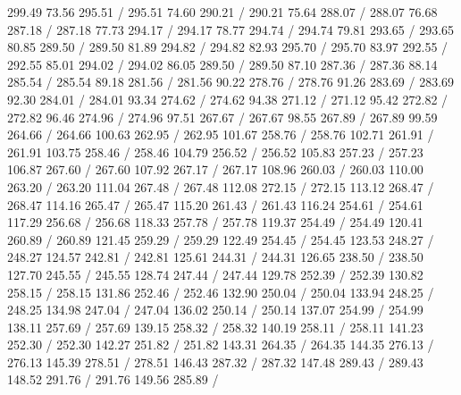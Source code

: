 { 299.49 73.56 295.51 /
 295.51 74.60 290.21 /
 290.21 75.64 288.07 /
 288.07 76.68 287.18 /
 287.18 77.73 294.17 /
 294.17 78.77 294.74 /
 294.74 79.81 293.65 /
 293.65 80.85 289.50 /
 289.50 81.89 294.82 /
 294.82 82.93 295.70 /
 295.70 83.97 292.55 /
 292.55 85.01 294.02 /
 294.02 86.05 289.50 /
 289.50 87.10 287.36 /
 287.36 88.14 285.54 /
 285.54 89.18 281.56 /
 281.56 90.22 278.76 /
 278.76 91.26 283.69 /
 283.69 92.30 284.01 /
 284.01 93.34 274.62 /
 274.62 94.38 271.12 /
 271.12 95.42 272.82 /
 272.82 96.46 274.96 /
 274.96 97.51 267.67 /
 267.67 98.55 267.89 /
 267.89 99.59 264.66 /
 264.66 100.63 262.95 /
 262.95 101.67 258.76 /
 258.76 102.71 261.91 /
 261.91 103.75 258.46 /
 258.46 104.79 256.52 /
 256.52 105.83 257.23 /
 257.23 106.87 267.60 /
 267.60 107.92 267.17 /
 267.17 108.96 260.03 /
 260.03 110.00 263.20 /
 263.20 111.04 267.48 /
 267.48 112.08 272.15 /
 272.15 113.12 268.47 /
 268.47 114.16 265.47 /
 265.47 115.20 261.43 /
 261.43 116.24 254.61 /
 254.61 117.29 256.68 /
 256.68 118.33 257.78 /
 257.78 119.37 254.49 /
 254.49 120.41 260.89 /
 260.89 121.45 259.29 /
 259.29 122.49 254.45 /
 254.45 123.53 248.27 /
 248.27 124.57 242.81 /
 242.81 125.61 244.31 /
 244.31 126.65 238.50 /
 238.50 127.70 245.55 /
 245.55 128.74 247.44 /
 247.44 129.78 252.39 /
 252.39 130.82 258.15 /
 258.15 131.86 252.46 /
 252.46 132.90 250.04 /
 250.04 133.94 248.25 /
 248.25 134.98 247.04 /
 247.04 136.02 250.14 /
 250.14 137.07 254.99 /
 254.99 138.11 257.69 /
 257.69 139.15 258.32 /
 258.32 140.19 258.11 /
 258.11 141.23 252.30 /
 252.30 142.27 251.82 /
 251.82 143.31 264.35 /
 264.35 144.35 276.13 /
 276.13 145.39 278.51 /
 278.51 146.43 287.32 /
 287.32 147.48 289.43 /
 289.43 148.52 291.76 /
 291.76 149.56 285.89 /
}
